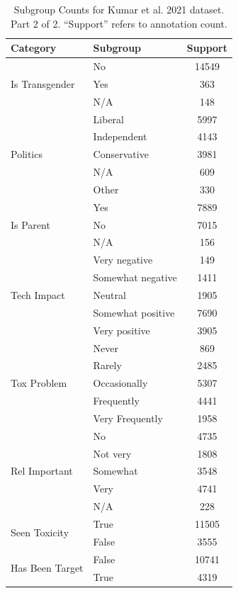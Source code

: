 \documentclass{article} %
\theoremstyle{definition}
\theoremstyle{plain}
\begin{document}
\begin{table}[t]
	\centering
	\small
	\begin{tabular}{llc}
		\toprule
		\textbf{Category} & \textbf{Subgroup} & \textbf{Support}\\
		\midrule
		\multirow{3}{*}{Is Transgender} & No & 14549 \\
		& Yes & 363 \\
		& N/A & 148 \\
		\midrule
		\multirow{5}{*}{Politics} & Liberal & 5997 \\
		& Independent & 4143 \\
		& Conservative & 3981 \\
		& N/A & 609 \\
		& Other & 330 \\
		\midrule
		\multirow{3}{*}{Is Parent} & Yes & 7889 \\
		& No & 7015 \\
		& N/A & 156 \\
		\midrule
		\multirow{5}{*}{Tech Impact} & Very negative & 149 \\
		& Somewhat negative & 1411 \\
		& Neutral & 1905 \\
		& Somewhat positive & 7690 \\
		& Very positive & 3905 \\
		\midrule
		\multirow{5}{*}{Tox Problem} & Never & 869 \\
		& Rarely & 2485 \\
		& Occasionally & 5307 \\
		& Frequently & 4441 \\
		& Very Frequently & 1958 \\
		\midrule
		\multirow{5}{*}{Rel Important} & No & 4735 \\
		& Not very & 1808 \\
		& Somewhat & 3548 \\
		& Very & 4741 \\
		& N/A & 228 \\
		\midrule
		\multirow{2}{*}{Seen Toxicity} & True & 11505 \\
		& False & 3555 \\
		\midrule
		\multirow{2}{*}{Has Been Target} & False & 10741 \\
		& True & 4319 \\
		\bottomrule
	\end{tabular}
	\caption{Subgroup Counts for Kumar et al. 2021 dataset. Part 2 of 2. ``Support'' refers to annotation count.}
	\label{tab:kumar-stats2}
\end{table}
\end{document}
